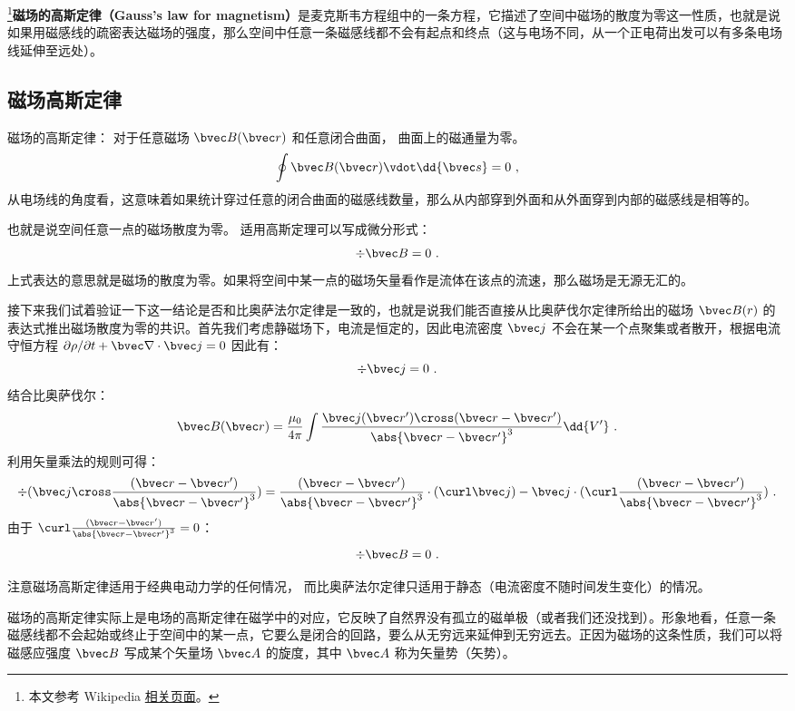 
\begin{issues}
\issueDraft
\end{issues}


\footnote{本文参考 Wikipedia \href{https://en.wikipedia.org/wiki/Gauss's_law_for_magnetism}{相关页面}。}\textbf{磁场的高斯定律（Gauss's law for magnetism）}是麦克斯韦方程组中的一条方程，它描述了空间中磁场的散度为零这一性质，也就是说如果用磁感线的疏密表达磁场的强度，那么空间中任意一条磁感线都不会有起点和终点（这与电场不同，从一个正电荷出发可以有多条电场线延伸至远处）。

\subsection{磁场高斯定律}
磁场的高斯定律： 对于任意磁场 $\bvec B(\bvec r)$ 和任意闭合曲面， 曲面上的磁通量为零。
\begin{equation}
\oint \bvec B(\bvec r) \vdot \dd{\bvec s} = 0~,
\end{equation}
从电场线的角度看，这意味着如果统计穿过任意的闭合曲面的磁感线数量，那么从内部穿到外面和从外面穿到内部的磁感线是相等的。

也就是说空间任意一点的磁场散度为零。 适用高斯定理可以写成微分形式：
\begin{equation}
\div\bvec B = 0~.
\end{equation}
上式表达的意思就是磁场的散度为零。如果将空间中某一点的磁场矢量看作是流体在该点的流速，那么磁场是无源无汇的。

接下来我们试着验证一下这一结论是否和比奥萨法尔定律是一致的，也就是说我们能否直接从比奥萨伐尔定律所给出的磁场 $\bvec B(r)$ 的表达式推出磁场散度为零的共识。首先我们考虑静磁场下，电流是恒定的，因此电流密度 $\bvec j$ 不会在某一个点聚集或者散开，根据电流守恒方程 $\partial \rho/\partial t + \bvec \nabla\cdot \bvec j=0$ 因此有：
\begin{equation}
\div \bvec j = 0  ~.
\end{equation}
结合比奥萨伐尔：
\begin{equation}
\bvec B(\bvec r) = \frac{\mu_0}{4\pi} \int \frac{\bvec j(\bvec r') \cross (\bvec r - \bvec r')}{\abs{\bvec r - \bvec r'}^3} \dd{V'}~.
\end{equation}
利用矢量乘法的规则可得：
\begin{equation}
\div(\bvec j \cross \frac{(\bvec r - \bvec r')}{\abs{\bvec r - \bvec r'}^3})=\frac{(\bvec r - \bvec r')}{\abs{\bvec r - \bvec r'}^3}\cdot(\curl \bvec j)-\bvec j\cdot(\curl \frac{(\bvec r - \bvec r')}{\abs{\bvec r - \bvec r'}^3})~.
\end{equation}
由于 $\curl \frac{(\bvec r - \bvec r')}{\abs{\bvec r - \bvec r'}^3} = 0$：
\begin{equation}
\div \bvec B = 0  ~.
\end{equation}

注意磁场高斯定律适用于经典电动力学的任何情况， 而比奥萨法尔定律只适用于静态（电流密度不随时间发生变化）的情况。

磁场的高斯定律实际上是电场的高斯定律在磁学中的对应，它反映了自然界没有孤立的磁单极（或者我们还没找到）。形象地看，任意一条磁感线都不会起始或终止于空间中的某一点，它要么是闭合的回路，要么从无穷远来延伸到无穷远去。正因为磁场的这条性质，我们可以将磁感应强度 $\bvec B$ 写成某个矢量场 $\bvec A$ 的旋度，其中 $\bvec A$ 称为矢量势（矢势）。
